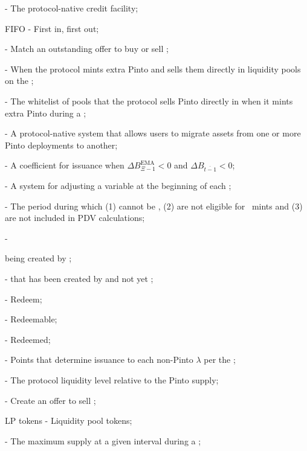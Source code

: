 \documentclass[class=article, crop=false]{standalone}
\begin{document}
\begin{itemize}[topsep=0pt, itemsep=3pt,leftmargin=16pt]
    \item[]  - The protocol-native credit facility;
    \item[] FIFO - First in, first out;
    \item[]  - Match an outstanding offer to buy or sell ;
    \item[]  - When the protocol mints extra Pinto and sells them directly in liquidity pools on the ;
    \item[]  - The whitelist of pools that the protocol sells Pinto directly in when it mints extra Pinto during a ;
    \item[]  - A protocol-native system that allows users to migrate assets from one or more Pinto deployments to another;
    \item[]  - A coefficient for  issuance when $\Delta B_{\Xi-1}^{\text{EMA}} < 0$ and $\Delta B_{\overline{t-1}} < 0$;
    \item[]  - A system for adjusting a variable at the beginning of each ;
    \item[]  - The period during which  (1) cannot be , (2) are not eligible for \Pinto\ mints and (3) are not included in  PDV calculations;
    \item[]  - { being created by ;
    \item[]  -  that has been created by  and not yet ;
    \item[]  - Redeem;
    \item[]  - Redeemable;
    \item[]  - Redeemed;
    \item[]  - Points that determine  issuance to each non-Pinto $\lambda$ per the ;
    \item[]  - The protocol liquidity level relative to the Pinto supply;
    \item[]  - Create an offer to sell ;
    \item[] LP tokens - Liquidity pool tokens;
    \item[]  - The maximum  supply at a given interval during a ;
}
\end{itemize}
\end{document}

